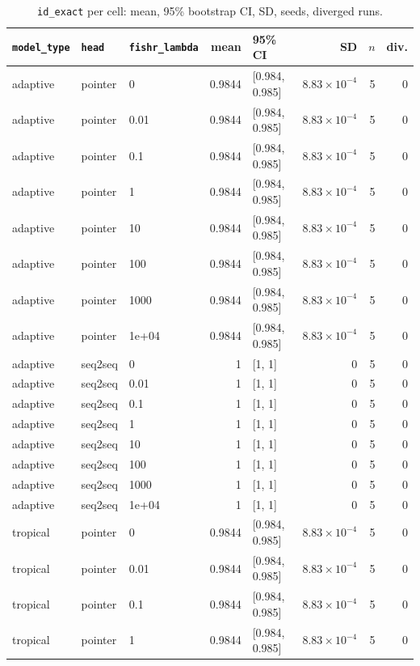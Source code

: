 \documentclass[10pt]{article}
\begin{document}
{\small
\begin{longtable}{lllrlrrr}
\caption{\texttt{id\_exact} per cell: mean, 95\% bootstrap CI, SD, seeds, diverged runs.}\label{tab:summary-id_exact}\\
\toprule
\texttt{model\_type} & \texttt{head} & \texttt{fishr\_lambda} & mean & 95\% CI & SD & $n$ & div.\\
\midrule
\endhead
adaptive & pointer & 0 & 0.9844 & [0.984, 0.985] & $8.83\times10^{-4}$ & 5 & 0\\
adaptive & pointer & 0.01 & 0.9844 & [0.984, 0.985] & $8.83\times10^{-4}$ & 5 & 0\\
adaptive & pointer & 0.1 & 0.9844 & [0.984, 0.985] & $8.83\times10^{-4}$ & 5 & 0\\
adaptive & pointer & 1 & 0.9844 & [0.984, 0.985] & $8.83\times10^{-4}$ & 5 & 0\\
adaptive & pointer & 10 & 0.9844 & [0.984, 0.985] & $8.83\times10^{-4}$ & 5 & 0\\
adaptive & pointer & 100 & 0.9844 & [0.984, 0.985] & $8.83\times10^{-4}$ & 5 & 0\\
adaptive & pointer & 1000 & 0.9844 & [0.984, 0.985] & $8.83\times10^{-4}$ & 5 & 0\\
adaptive & pointer & 1e+04 & 0.9844 & [0.984, 0.985] & $8.83\times10^{-4}$ & 5 & 0\\
adaptive & seq2seq & 0 & 1 & [1, 1] & 0 & 5 & 0\\
adaptive & seq2seq & 0.01 & 1 & [1, 1] & 0 & 5 & 0\\
adaptive & seq2seq & 0.1 & 1 & [1, 1] & 0 & 5 & 0\\
adaptive & seq2seq & 1 & 1 & [1, 1] & 0 & 5 & 0\\
adaptive & seq2seq & 10 & 1 & [1, 1] & 0 & 5 & 0\\
adaptive & seq2seq & 100 & 1 & [1, 1] & 0 & 5 & 0\\
adaptive & seq2seq & 1000 & 1 & [1, 1] & 0 & 5 & 0\\
adaptive & seq2seq & 1e+04 & 1 & [1, 1] & 0 & 5 & 0\\
tropical & pointer & 0 & 0.9844 & [0.984, 0.985] & $8.83\times10^{-4}$ & 5 & 0\\
tropical & pointer & 0.01 & 0.9844 & [0.984, 0.985] & $8.83\times10^{-4}$ & 5 & 0\\
tropical & pointer & 0.1 & 0.9844 & [0.984, 0.985] & $8.83\times10^{-4}$ & 5 & 0\\
tropical & pointer & 1 & 0.9844 & [0.984, 0.985] & $8.83\times10^{-4}$ & 5 & 0\\

\end{longtable}}
\end{document}
